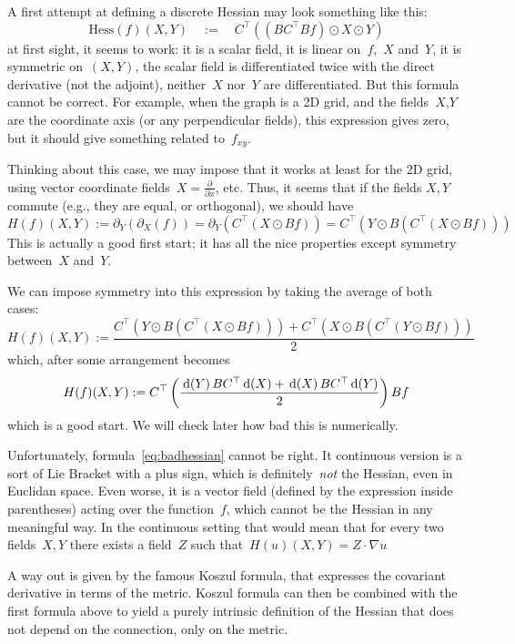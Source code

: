 A first attempt at defining a discrete Hessian may look something like this:
\[
	\mathrm{Hess}\left(f\right)(X,Y)
	\quad
	:=
	\quad
	C^\top\left(\left(BC^\top Bf\right)\odot X\odot Y\right)
\]
at first sight, it seems to work: it is a scalar field, it is linear
on~$f$,~$X$ and~$Y$, it is symmetric on~$(X,Y)$, the scalar field is differentiated twice with the direct
derivative (not the adjoint), neither~$X$ nor~$Y$ are differentiated.
But this formula cannot be correct.  For example, when the graph is a 2D
grid, and the fields~$X$,$Y$ are the coordinate axis (or any perpendicular
fields), this expression gives zero, but it should give something
related to~$f_{xy}$.

Thinking about this case, we may impose that it works at least for the 2D
grid, using vector coordinate fields~$X=\frac{\partial}{\partial x}$, etc.
Thus, it seems that if the fields $X,Y$ commute (e.g., they are equal, or
orthogonal), we should have
\[
	H(f)(X,Y):= \partial_Y(\partial_X(f)) =\partial_Y(C^\top(X\odot Bf))
	=C^\top(Y\odot B(C^\top(X\odot Bf)))
\]
This is actually a good first start; it has all the nice properties except
symmetry between~$X$ and~$Y$.

We can impose symmetry into this expression by taking the average of both
cases:
\begin{equation*}
	H(f)(X,Y):=
	\frac{
		C^\top(Y\odot B(C^\top(X\odot Bf)))
		+
		C^\top(X\odot B(C^\top(Y\odot Bf)))
	}2
\end{equation*}
which, after some arrangement becomes
\begin{equation}\label{eq:badhessian}
	H(f)(X,Y):=
	C^\top\left(
		\frac{
			\,\mathrm{d}\!\left(Y\right)BC^\top\,\mathrm{d}\!\left(X\right)
			+
			\,\mathrm{d}\!\left(X\right)BC^\top\,\mathrm{d}\!\left(Y\right)
		}2
	\right) Bf
\end{equation}
which is a good start.  We will check later how bad this is numerically.

Unfortunately, formula~\eqref{eq:badhessian} cannot be right.  It continuous
version is a sort of Lie Bracket with a plus sign, which is
definitely~\emph{not} the Hessian, even in Euclidan space.
Even worse, it is a vector field (defined by the expression inside
parentheses) acting over the function~$f$, which cannot be the Hessian in any
meaningful way.  In the continuous setting that would mean that for every two
fields~$X,Y$ there exists a field~$Z$ such that~$H(u)(X,Y)=Z\cdot\nabla u$

A way out is given by the famous Koszul formula, that expresses the covariant
derivative in terms of the metric. Koszul formula can then be combined with
the first formula above to yield a purely intrinsic definition of the Hessian
that does not depend on the connection, only on the metric.

